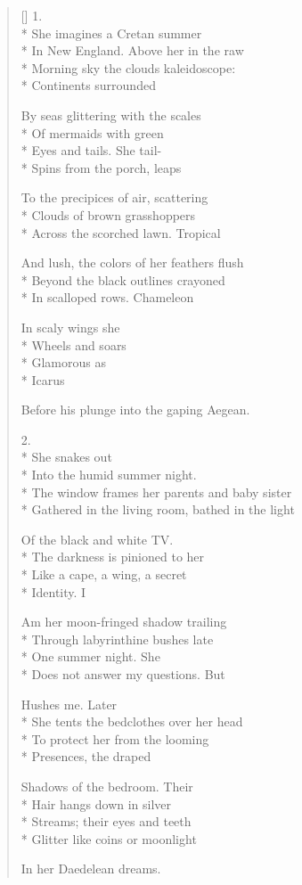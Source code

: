 \label{ch:archaeopteryx}
\settowidth{\versewidth}{does not answer my questions. \qquad  \qquad But}
\begin{verse}[\versewidth]
1. \\*
She imagines a Cretan summer\\*
In New England.  Above her in the raw\\*
Morning sky the clouds kaleidoscope:\\*
Continents surrounded

By seas glittering with the scales\\*
Of mermaids with green\\*
Eyes and tails. \qquad  \qquad She tail-\\*
Spins from the porch, leaps

To the precipices of air, scattering\\*
Clouds of brown grasshoppers\\*
Across the scorched lawn. \qquad Tropical

And lush, the colors of her feathers flush\\*
Beyond the black outlines crayoned\\*
In scalloped rows. \qquad Chameleon

 \qquad In scaly wings she\\*
 \qquad \quad Wheels and soars\\*
 \qquad \qquad Glamorous as\\*
 \qquad \qquad \quad Icarus 

Before his plunge into the gaping Aegean.

2.\\*
She snakes out\\*
Into the humid summer night.\\*
The window frames her parents and baby sister\\*
Gathered in the living room, bathed in the light

Of the black and white TV.\\*
The darkness is pinioned to her\\*
Like a cape, a wing, a secret\\*
Identity. \qquad I

Am her moon-fringed shadow trailing\\*
Through labyrinthine bushes late\\*
One summer night. \qquad She \\*
Does not answer my questions. \qquad  \qquad But

Hushes me.  Later\\*
She tents the bedclothes over her head\\*
To protect her from the looming\\*
Presences, the draped

Shadows of the bedroom.  Their\\*
Hair hangs down in silver\\*
Streams; their eyes and teeth\\*
Glitter like coins or moonlight

In her Daedelean dreams.
\end{verse}

